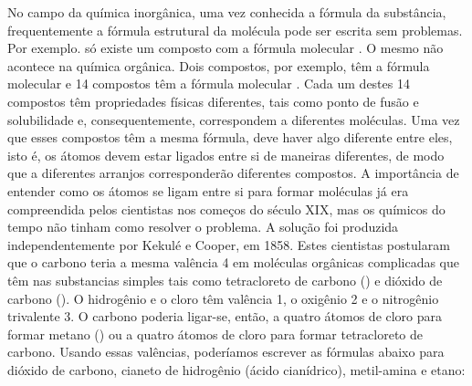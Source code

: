 No campo da química inorgânica, uma vez conhecida a fórmula da substância, frequentemente a fórmula estrutural da molécula pode ser escrita sem problemas. Por exemplo. só existe um composto com a fórmula molecular . O mesmo não acontece na química orgânica. Dois compostos, por exemplo, têm a fórmula molecular  e 14 compostos têm a fórmula molecular . Cada um destes 14 compostos têm propriedades físicas diferentes, tais como ponto de fusão e solubilidade e, consequentemente, correspondem a diferentes moléculas. Uma vez que esses compostos têm a mesma fórmula, deve haver algo diferente entre eles, isto é, os átomos devem estar ligados entre si de maneiras diferentes, de modo que a diferentes arranjos corresponderão diferentes compostos. A importância de entender como os átomos se ligam entre si para formar moléculas já era compreendida pelos cientistas nos começos do século XIX, mas os químicos do tempo não tinham como resolver o problema. A solução foi produzida independentemente por Kekulé e Cooper, em 1858. Estes cientistas postularam que o carbono teria a mesma valência 4 em moléculas orgânicas complicadas que têm nas substancias simples tais como tetracloreto de carbono () e dióxido de carbono (). O hidrogênio e o cloro têm valência 1, o oxigênio 2 e o nitrogênio trivalente 3. O carbono poderia ligar-se, então, a quatro átomos de cloro para formar metano () ou a quatro átomos de cloro para formar tetracloreto de carbono. Usando essas valências, poderíamos escrever as fórmulas abaixo para dióxido de carbono, cianeto de hidrogênio (ácido cianídrico), metil-amina e etano:

\begin{tightcenter}
    \chemnameinit{}
    \qquad\qquad\qquad
    \chemnameinit{}
    \qquad\qquad\qquad
    \chemnameinit{}
\end{tightcenter}

\begin{tightcenter}
    \chemnameinit{}
    \qquad\qquad\qquad
    \chemnameinit{}
    \qquad\qquad\qquad
    \chemnameinit{}
\end{tightcenter}
 
